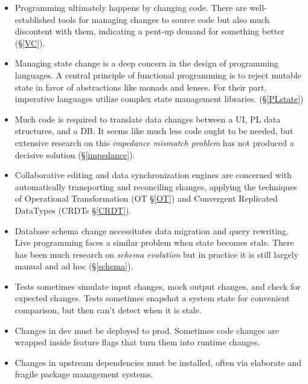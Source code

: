 \documentclass[english,submission]{programming}
\begin{document}
\begin{itemize}

  \item Programming ultimately happens by changing code. There are well-established tools for managing changes to source code but also much discontent with them, indicating a pent-up demand for something better (\S\ref{VC}).

  \item Managing state change is a deep concern in the design of programming languages. A central principle of functional programming is to reject mutable state in favor of abstractions like monads and lenses. For their part, imperative languages utilize complex state management libraries. (\S\ref{PLstate})

  \item Much code is required to translate data changes between a UI, PL data structures, and a DB. It seems like much less code ought to be needed, but extensive research on this \textit{impedance mismatch problem} has not produced a decisive solution (\S\ref{impedance}).

  \item Collaborative editing and data synchronization engines are concerned with automatically transporting and reconciling changes, applying the techniques of Operational Transformation (OT \S\ref{OT}) and Convergent Replicated DataTypes (CRDTs \S\ref{CRDT}).

  \item Database schema change necessitates data migration and query rewriting. Live programming faces a similar problem when state becomes stale. There has been much research on \textit{schema evolution} but in practice it is still largely manual and ad hoc (\S \ref{schema}).

  \item Tests sometimes simulate input changes, mock output changes, and check for expected changes. Tests sometimes snapshot a system state for convenient comparison, but then can't detect when it is stale.

  \item Changes in dev must be deployed to prod.
  Sometimes code changes are wrapped inside feature flags that turn them into runtime changes.

  \item Changes in upstream dependencies must be installed, often via elaborate and fragile package management systems.

\end{itemize}
\end{document}
